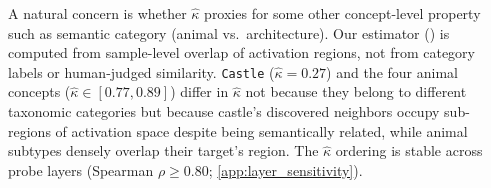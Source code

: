 A natural concern is whether $\hat\kappa$ proxies for some other concept-level property such as semantic category (animal vs.\ architecture). Our estimator () is computed from sample-level overlap of activation regions, not from category labels or human-judged similarity. \texttt{Castle} ($\hat\kappa = 0.27$) and the four animal concepts ($\hat\kappa \in [0.77, 0.89]$) differ in $\hat\kappa$ not because they belong to different taxonomic categories but because castle's discovered neighbors 
occupy sub-regions of activation space despite being semantically related, while animal subtypes 
densely overlap their target's region. 
The $\hat\kappa$ ordering is stable across probe layers (Spearman $\rho \geq 0.80$; \cref{app:layer_sensitivity}).


